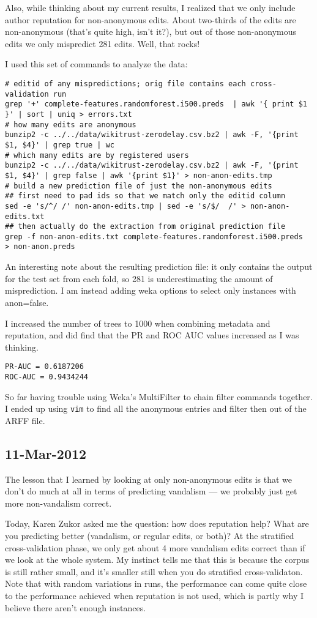 Also, while thinking about my current results, I realized that we only
include author reputation for non-anonymous edits.
About two-thirds of the edits are non-anonymous (that's quite high,
isn't it?), but out of those non-anonymous edits we only mispredict 281 edits.
Well, that rocks!

I used this set of commands to analyze the data:
\begin{verbatim}
# editid of any mispredictions; orig file contains each cross-validation run
grep '+' complete-features.randomforest.i500.preds  | awk '{ print $1 }' | sort | uniq > errors.txt
# how many edits are anonymous
bunzip2 -c ../../data/wikitrust-zerodelay.csv.bz2 | awk -F, '{print $1, $4}' | grep true | wc
# which many edits are by registered users
bunzip2 -c ../../data/wikitrust-zerodelay.csv.bz2 | awk -F, '{print $1, $4}' | grep false | awk '{print $1}' > non-anon-edits.tmp
# build a new prediction file of just the non-anonymous edits
## first need to pad ids so that we match only the editid column
sed -e 's/^/ /' non-anon-edits.tmp | sed -e 's/$/  /' > non-anon-edits.txt
## then actually do the extraction from original prediction file
grep -f non-anon-edits.txt complete-features.randomforest.i500.preds  > non-anon.preds
\end{verbatim}

An interesting note about the resulting prediction file: it only
contains the output for the test set from each fold, so 281 is
underestimating the amount of misprediction.
I am instead adding weka options to select only instances with
anon=false.

I increased the number of trees to 1000 when combining metadata and
reputation, and did find that the PR and ROC AUC values increased
as I was thinking.
\begin{verbatim}
PR-AUC = 0.6187206
ROC-AUC = 0.9434244
\end{verbatim}

So far having trouble using Weka's MultiFilter to chain filter commands
together.  I ended up using \texttt{vim} to find all the anonymous
entries and filter then out of the ARFF file.

\subsection{11-Mar-2012}

The lesson that I learned by looking at only non-anonymous edits is that
we don't do much at all in terms of predicting vandalism --- we probably
just get more non-vandalism correct.

Today, Karen Zukor asked me the question: how does reputation help?
What are you predicting better (vandalism, or regular edits, or both)?
At the stratified cross-validation phase, we only get about 4 more
vandalism edits correct than if we look at the whole system.
My instinct tells me that this is because the corpus is still rather
small, and it's smaller still when you do stratified cross-validaton.
Note that with random variations in runs, the performance can come quite
close to the performance achieved when reputation is not used, which is
partly why I believe there aren't enough instances.
